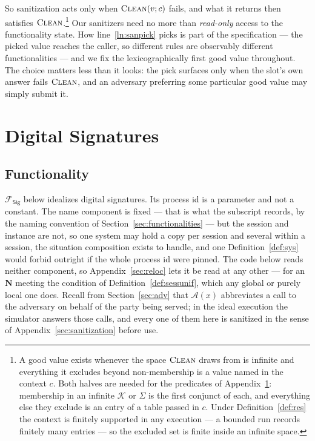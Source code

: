\documentclass[11pt,a4paper]{article}
\newcommand{\admits}{\mathbf{N}}
\newcommand{\Adv}{\mathcal{A}}
\newcommand{\op}[1]{\textsc{#1}}
\newcommand{\Fsig}{\mathcal{F}_{\mathsf{Sig}}}
\newcommand{\Keys}{\mathcal{K}}
\newcommand{\Sigs}{\Sigma}
\newcommand{\Clean}{\op{Clean}}
\theoremstyle{accentdef}
\theoremstyle{accentplain}
\begin{document}
So sanitization acts only when $\Clean(v; c)$ fails, and what it returns then satisfies
$\Clean$.\footnote{A good value exists whenever the space $\Clean$ draws from is infinite and
everything it excludes beyond non-membership is a value named in the context $c$. Both halves are
needed for the predicates of Appendix~\ref{sec:fsig}: membership in an infinite $\Keys$ or $\Sigs$
is the first conjunct of each, and everything else they exclude is an entry of a table passed in
$c$. Under Definition~\ref{def:res} the context is finitely supported in any execution --- a
bounded run records finitely many entries --- so the excluded set is finite inside an infinite
space.} Our sanitizers need no more
than \emph{read-only} access to the functionality state. How line~\ref{ln:sanpick} picks is part
of the specification --- the picked value reaches the caller, so different rules are observably
different functionalities --- and we fix the lexicographically first good value throughout. The
choice matters less than it looks: the pick surfaces only when the slot's own answer fails
$\Clean$, and an adversary preferring some particular good value may simply submit it.

\section{Digital Signatures}\label{sec:fsig}

\subsection{Functionality}\label{sec:fsigfunc}

$\Fsig$ below idealizes digital signatures. Its process id is a parameter and not a constant. The
name component is fixed --- that is what the subscript records, by the naming convention of
Section~\ref{sec:functionalities} --- but the session and instance are not, so one system may hold
a copy per session and several within a session, the situation composition exists to handle, and
one Definition~\ref{def:sys} would forbid outright if the whole process id were pinned. The code
below reads neither component, so Appendix~\ref{sec:reloc} lets it be read at any other --- for an
$\admits$ meeting the condition of Definition~\ref{def:sessunif}, which any global or purely local one
does. Recall
from Section~\ref{sec:adv} that $\Adv(x)$ abbreviates a call to the adversary on behalf of the
party being served; in the ideal execution the simulator answers those calls, and every one of
them here is sanitized in the sense of Appendix~\ref{sec:sanitization} before use.
\end{document}
